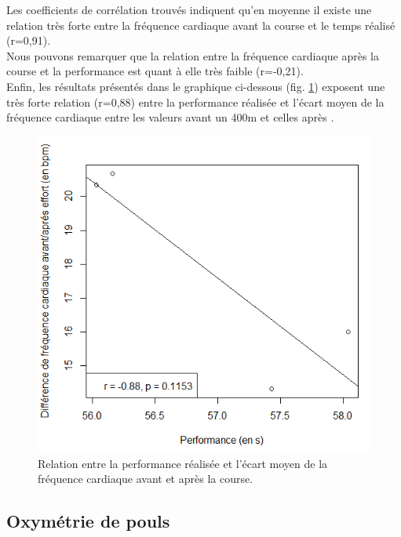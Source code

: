           Les coefficients de corrélation trouvés indiquent qu'en moyenne il existe une relation très forte entre la fréquence cardiaque avant la course et le temps réalisé (r=0,91).\\
          
          Nous pouvons remarquer que la relation entre la fréquence cardiaque après la course et la performance est quant à elle très faible (r=-0,21).\\
         
 
         Enfin, les résultats présentés dans le graphique ci-dessous (fig. \ref{fig:fc_perf_ecart_moy_seule}) exposent une très forte relation (r=0,88) entre la performance réalisée et l'écart moyen de la fréquence cardiaque entre les valeurs avant un 400m et celles après .\\
         
         \begin{figure}[H]
                \centering
                \includegraphics[scale=0.6]{images/fc_perf_ecart_moy_seule}
                \caption{\label{fig:fc_perf_ecart_moy_seule}Relation entre la performance réalisée et l'écart moyen de la fréquence cardiaque avant et après la course.}
            \end{figure}
            
            
        \subsection{Oxymétrie de pouls}
        \label{section:resOxy}
        
